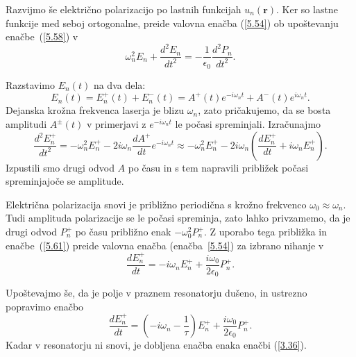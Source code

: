 Razvijmo še električno polarizacijo po lastnih funkcijah $u_n(\mathbf{r})$. 
Ker so lastne funkcije med seboj ortogonalne, preide valovna enačba (\ref{5.54}) 
ob upoštevanju enačbe~(\ref{5.58}) v 
\begin{equation}  
\label{5.59}
\omega_n^2 E_n+\frac{d^2 E_n}{dt^2}= 
-\frac{1}{\epsilon_0}\frac{d^2P_n}{dt^2}.
\end{equation}

Razstavimo $E_n(t)$ na dva dela: 
\begin{equation}  \label{5.60}
E_n(t)=E_n^+(t)+E_n^-(t)=A^+(t)e^{-i
\omega_nt}+A^-(t)e^{i \omega_nt}.
\end{equation}
Dejanska krožna frekvenca laserja je blizu $\omega_n$, zato pričakujemo,
da se bosta amplitudi $A^{\pm}(t)$ v primerjavi z $e^{-i \omega_nt}$ le
počasi spreminjali. Izračunajmo 
\begin{equation}  
\label{5.61}
\frac{d^2 E_n^+}{dt^2}=-\omega_n^2 E_n^+ - 2i \omega_n 
\frac{dA^+}{dt} e^{-i \omega_nt} \approx 
-\omega_n^2 E_n^+-2i \omega_n\left(\frac{dE_n^+}{dt}+
i \omega_nE_n^+\right).
\end{equation}
Izpustili smo drugi odvod $A$ po času in s tem napravili približek počasi spreminjajoče se amplitude.

Električna polarizacija snovi je približno periodična s krožno frekvenco $\omega_0 \approx \omega_n$.
Tudi amplituda polarizacije se le počasi spreminja, zato lahko privzamemo, da je 
drugi odvod $P_n^+$ po času približno enak $-\omega_0^2 P_n^+$. Z uporabo tega
približka in enačbe~(\ref{5.61}) preide valovna enačba (enačba~\ref{5.54}) za izbrano nihanje v 
\begin{equation}  
\label{5.62}
\frac{dE_n^+}{dt}=-i \omega_n E_n^++
\frac{i \omega_0}{2\epsilon_0}P_n^+.
\end{equation}

Upoštevajmo še, da je polje v praznem resonatorju dušeno, in ustrezno popravimo enačbo
\begin{equation}  
\label{5.63}
\frac{dE_n^+}{dt}=\left(-i \omega_n-\frac{1}{\tau}\right) E_n^+ 
+\frac{i \omega_0}{2\epsilon_0}P_n^+.
\end{equation}
Kadar v resonatorju ni snovi, je dobljena enačba enaka enačbi (\ref{3.36}).

